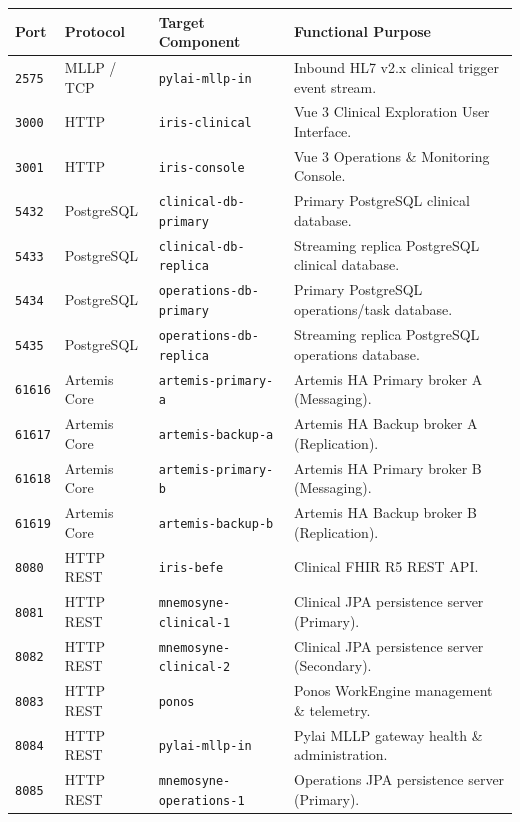 \begin{table}[htbp]
\centering
\small
\begin{tabularx}{\textwidth}{l l l X}
\toprule
\textbf{Port} & \textbf{Protocol} & \textbf{Target Component} & \textbf{Functional Purpose} \\
\midrule
\texttt{2575} & MLLP / TCP & \texttt{pylai-mllp-in} & Inbound HL7 v2.x clinical trigger event stream. \\
\texttt{3000} & HTTP & \texttt{iris-clinical} & Vue 3 Clinical Exploration User Interface. \\
\texttt{3001} & HTTP & \texttt{iris-console} & Vue 3 Operations \& Monitoring Console. \\
\texttt{5432} & PostgreSQL & \texttt{clinical-db-primary} & Primary PostgreSQL clinical database. \\
\texttt{5433} & PostgreSQL & \texttt{clinical-db-replica} & Streaming replica PostgreSQL clinical database. \\
\texttt{5434} & PostgreSQL & \texttt{operations-db-primary} & Primary PostgreSQL operations/task database. \\
\texttt{5435} & PostgreSQL & \texttt{operations-db-replica} & Streaming replica PostgreSQL operations database. \\
\texttt{61616}& Artemis Core & \texttt{artemis-primary-a} & Artemis HA Primary broker A (Messaging). \\
\texttt{61617}& Artemis Core & \texttt{artemis-backup-a} & Artemis HA Backup broker A (Replication). \\
\texttt{61618}& Artemis Core & \texttt{artemis-primary-b} & Artemis HA Primary broker B (Messaging). \\
\texttt{61619}& Artemis Core & \texttt{artemis-backup-b} & Artemis HA Backup broker B (Replication). \\
\texttt{8080} & HTTP REST & \texttt{iris-befe} & Clinical FHIR R5 REST API. \\
\texttt{8081} & HTTP REST & \texttt{mnemosyne-clinical-1} & Clinical JPA persistence server (Primary). \\
\texttt{8082} & HTTP REST & \texttt{mnemosyne-clinical-2} & Clinical JPA persistence server (Secondary). \\
\texttt{8083} & HTTP REST & \texttt{ponos} & Ponos WorkEngine management \& telemetry. \\
\texttt{8084} & HTTP REST & \texttt{pylai-mllp-in} & Pylai MLLP gateway health \& administration. \\
\texttt{8085} & HTTP REST & \texttt{mnemosyne-operations-1} & Operations JPA persistence server (Primary). \\

\end{tabularx}
\end{table}
